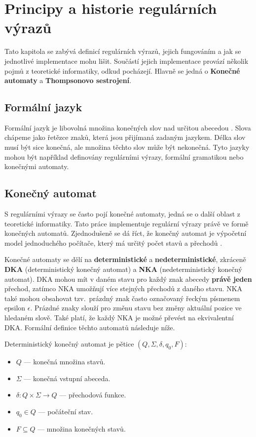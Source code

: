 \chapter{Principy a historie regulárních výrazů}\label{sec:Principle}

Tato kapitola se zabývá definicí regulárních výrazů, jejich fungováním a jak se jednotlivé implementace mohu lišit. 
Součástí jejich implementace provází několik pojmů z teoretické informatiky, odkud pocházejí.
Hlavně se jedná o \textbf{Konečné automaty} a \textbf{Thompsonovo sestrojení}.

\section{Formální jazyk}
Formální jazyk je libovolná množina konečných slov nad určitou abecedou \cite{MUNIFL}. 
Slova chápeme jako řetězce znaků, která jsou přijímaná zadaným jazykem.
Délka slov musí být sice konečná, ale množina těchto slov může být nekonečná. 
Tyto jazyky mohou být například definovány regulárními výrazy, formální gramatikou nebo konečnými automaty. 

\section{Konečný automat}\label{sec:FiniteAutomaton}
S regulárními výrazy se často pojí konečné automaty, jedná se o další oblast z teoretické informatiky.
Tato práce implementuje regulární výrazy právě ve formě konečných automatů.
Zjednodušeně se dá říct, že konečný automat je výpočetní model jednoduchého počítače, který má určitý počet stavů a přechodů \cite{Havrlant}. 

Konečné automaty se dělí na \textbf{deterministické} a \textbf{nedeterministické}, zkráceně \textbf{DKA} (deterministický konečný automat) a \textbf{NKA} (nedeterministický konečný automat).
DKA mohou mít v daném stavu pro každý znak abecedy \textbf{právě jeden} přechod, zatímco NKA umožňují více stejných přechodů z daného stavu. 
NKA také mohou obsahovat tzv.\ prázdný znak často označovaný řeckým písmenem epsilon $\epsilon$. 
Prázdné znaky slouží pro změnu stavu bez změny aktuální pozice ve hledaném slově. 
Také platí, že každý NKA je možné převést na ekvivalentní DKA.
Formální definice těchto automatů následuje níže.

\newpage

\noindent Deterministický konečný automat je pětice $(Q, \Sigma, \delta, q_0, F)$\cite{Viswanathan_2017}:
\begin{itemize}
	\item $Q$ --- konečná množina stavů.
	\item $\Sigma$ --- konečná vstupní abeceda.
	\item $\delta: Q \times \Sigma \rightarrow Q$ --- přechodová funkce.
	\item $q_0 \in Q$ --- počáteční stav.
	\item $F \subseteq Q$ --- množina konečných stavů.
\end{itemize}

